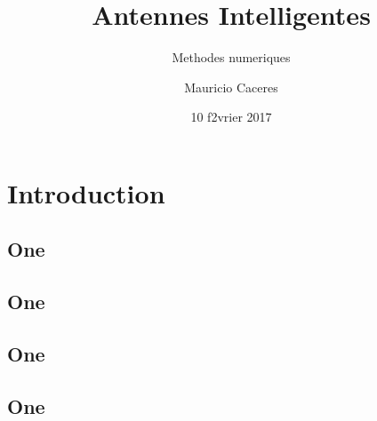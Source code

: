 \documentclass[11pt]{beamer}
\begin{document}
	\author{Mauricio Caceres}
	\title{Antennes Intelligentes}
	\subtitle{Methodes numeriques}
	\logo{}
	\date{10 f2vrier 2017}
	\subject{Présentation travail autonomme}
	\frame[plain]{\maketitle}
%
%
	\section{Introduction}
	\begin{frame}
	\subsection{One}
		\frametitle{}
	\end{frame}
%
%

\begin{frame}
	\subsection{One}
	\frametitle{}
\end{frame}

\begin{frame}
	\subsection{One}
	\frametitle{}
\end{frame}

\begin{frame}
	\subsection{One}
	\frametitle{}
\end{frame}
\end{document}
